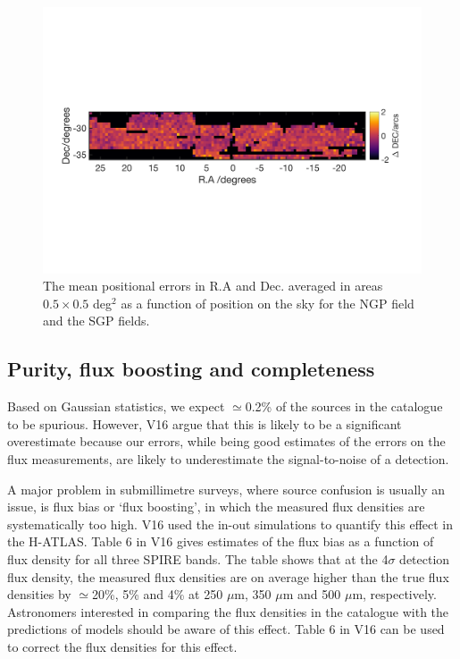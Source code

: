 \documentclass[useAMS,usenatbib]{mn2e}
\begin{document}
\begin{figure}
\includegraphics[scale=0.6,trim={0 60mm 0mm 80mm}, clip]{sgp_ddec.png}
\caption{\protect\label{fig_pos_errs} The mean positional errors in
  R.A and Dec. averaged in areas $0.5\times0.5$ deg$^2$ as a
  function of position on the sky for the NGP field and the SGP
  fields. 
}
\end{figure} 

\subsection{Purity, flux boosting and completeness}

Based on Gaussian statistics, we expect $\simeq$0.2\% of the sources
in the catalogue to be spurious. However, V16 argue that this is
likely to be a significant overestimate because our errors, while being
good estimates of the errors on the flux measurements, are likely to
underestimate 
the signal-to-noise of a detection.

A major problem in submillimetre surveys, where source confusion is usually
an issue, is flux bias or `flux boosting', in which the measured flux densities
are systematically too high. V16 used the in-out simulations to quantify this
effect in the H-ATLAS. Table 6 in V16 gives estimates of the flux bias as
a function of flux density for all three SPIRE bands. The table shows that
at the 4$\sigma$ detection flux density, the measured flux densities are
on average higher than the true flux densities by $\simeq$20\%, 5\% and
4\% at 250 $\mu$m, 350 $\mu$m and 500 $\mu$m, respectively. Astronomers interested
in comparing the flux densities in the catalogue with the predictions of models should be
aware of this effect. Table 6 in V16 can be used to correct the flux densities
for this effect.
\end{document}
